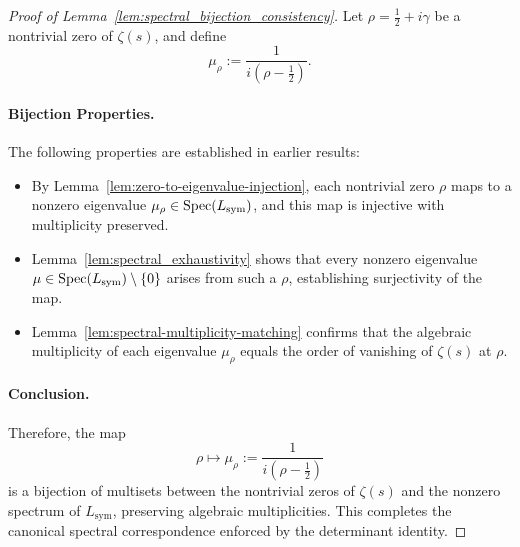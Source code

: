 \begin{proof}[Proof of Lemma~\ref{lem:spectral_bijection_consistency}]
Let \( \rho = \tfrac{1}{2} + i\gamma \) be a nontrivial zero of \( \zeta(s) \), and define
\[
\mu_\rho := \frac{1}{i(\rho - \tfrac{1}{2})}.
\]

\paragraph{Bijection Properties.}
The following properties are established in earlier results:

\begin{itemize}
  \item By Lemma~\ref{lem:zero-to-eigenvalue-injection}, each nontrivial zero \( \rho \) maps to a nonzero eigenvalue \( \mu_\rho \in \operatorname{Spec}(L_{\mathrm{sym}}) \), and this map is injective with multiplicity preserved.

  \item Lemma~\ref{lem:spectral_exhaustivity} shows that every nonzero eigenvalue \( \mu \in \operatorname{Spec}(L_{\mathrm{sym}}) \setminus \{0\} \) arises from such a \( \rho \), establishing surjectivity of the map.

  \item Lemma~\ref{lem:spectral-multiplicity-matching} confirms that the algebraic multiplicity of each eigenvalue \( \mu_\rho \) equals the order of vanishing of \( \zeta(s) \) at \( \rho \).
\end{itemize}

\paragraph{Conclusion.}
Therefore, the map
\[
\rho \mapsto \mu_\rho := \frac{1}{i(\rho - \tfrac{1}{2})}
\]
is a bijection of multisets between the nontrivial zeros of \( \zeta(s) \) and the nonzero spectrum of \( L_{\mathrm{sym}} \), preserving algebraic multiplicities. This completes the canonical spectral correspondence enforced by the determinant identity.
\end{proof}
%  